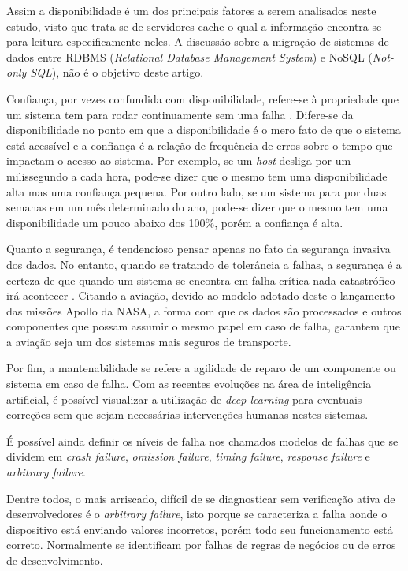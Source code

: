 \documentclass[conference]{IEEEtran}
\begin{document}
Assim a disponibilidade é um dos principais fatores a serem analisados neste estudo, visto que trata-se de servidores cache o qual a informação encontra-se para leitura especificamente neles. A discussão sobre a migração de sistemas de dados entre RDBMS (\textit{Relational Database Management System}) e NoSQL (\textit{Not-only SQL}), não é o objetivo deste artigo.

Confiança, por vezes confundida com disponibilidade, refere-se à propriedade que um sistema tem para rodar continuamente sem uma falha \cite{Tanenbaum:2006:DSP:1202502}. Difere-se da disponibilidade no ponto em que a disponibilidade é o mero fato de que o sistema está acessível e a confiança é a relação de frequência de erros sobre o tempo que impactam o acesso ao sistema. Por exemplo, se um \textit{host} desliga por um milissegundo a cada hora, pode-se dizer que o mesmo tem uma disponibilidade alta mas uma confiança pequena. Por outro lado, se um sistema para por duas semanas em um mês determinado do ano, pode-se dizer que o mesmo tem uma disponibilidade um pouco abaixo dos 100\%, porém a confiança é alta.

Quanto a segurança, é tendencioso pensar apenas no fato da segurança invasiva dos dados. No entanto, quando se tratando de tolerância a falhas, a segurança é a certeza de que quando um sistema se encontra em falha crítica nada catastrófico irá acontecer \cite{Tanenbaum:2006:DSP:1202502}. Citando a aviação, devido ao modelo adotado deste o lançamento das missões Apollo da NASA, a forma com que os dados são processados e outros componentes que possam assumir o mesmo papel em caso de falha, garantem que a aviação seja um dos sistemas mais seguros de transporte. \cite{herman}

Por fim, a mantenabilidade se refere a agilidade de reparo de um componente ou sistema em caso de falha. Com as recentes evoluções na área de inteligência artificial, é possível visualizar a utilização de \textit{deep learning} para eventuais correções sem que sejam necessárias intervenções humanas nestes sistemas.

É possível ainda definir os níveis de falha nos chamados modelos de falhas que se dividem em \textit{crash failure}, \textit{omission failure}, \textit{timing failure}, \textit{response failure} e \textit{arbitrary failure}.

Dentre todos, o mais arriscado, difícil de se diagnosticar sem verificação ativa de desenvolvedores é o \textit{arbitrary failure}, isto porque se caracteriza a falha aonde o dispositivo está enviando valores incorretos, porém todo seu funcionamento está correto. Normalmente se identificam por falhas de regras de negócios ou de erros de desenvolvimento.
\end{document}
